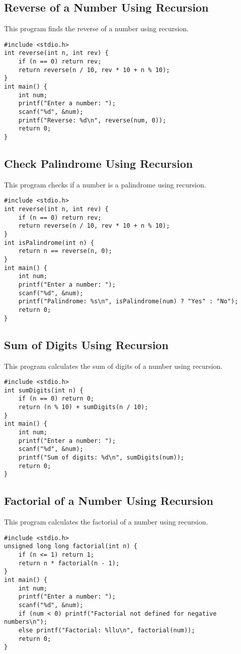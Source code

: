 \documentclass[a4paper,12pt]{article}
\begin{document}
\subsection{Reverse of a Number Using Recursion}
This program finds the reverse of a number using recursion.
\begin{lstlisting}[caption={Reverse of a Number Using Recursion}]
#include <stdio.h>
int reverse(int n, int rev) {
    if (n == 0) return rev;
    return reverse(n / 10, rev * 10 + n % 10);
}
int main() {
    int num;
    printf("Enter a number: ");
    scanf("%d", &num);
    printf("Reverse: %d\n", reverse(num, 0));
    return 0;
}
\end{lstlisting}
\clearpage

\subsection{Check Palindrome Using Recursion}
This program checks if a number is a palindrome using recursion.
\begin{lstlisting}[caption={Check Palindrome Using Recursion}]
#include <stdio.h>
int reverse(int n, int rev) {
    if (n == 0) return rev;
    return reverse(n / 10, rev * 10 + n % 10);
}
int isPalindrome(int n) {
    return n == reverse(n, 0);
}
int main() {
    int num;
    printf("Enter a number: ");
    scanf("%d", &num);
    printf("Palindrome: %s\n", isPalindrome(num) ? "Yes" : "No");
    return 0;
}
\end{lstlisting}
\clearpage

\subsection{Sum of Digits Using Recursion}
This program calculates the sum of digits of a number using recursion.
\begin{lstlisting}[caption={Sum of Digits Using Recursion}]
#include <stdio.h>
int sumDigits(int n) {
    if (n == 0) return 0;
    return (n % 10) + sumDigits(n / 10);
}
int main() {
    int num;
    printf("Enter a number: ");
    scanf("%d", &num);
    printf("Sum of digits: %d\n", sumDigits(num));
    return 0;
}
\end{lstlisting}
\clearpage

\subsection{Factorial of a Number Using Recursion}
This program calculates the factorial of a number using recursion.
\begin{lstlisting}[caption={Factorial of a Number Using Recursion}]
#include <stdio.h>
unsigned long long factorial(int n) {
    if (n <= 1) return 1;
    return n * factorial(n - 1);
}
int main() {
    int num;
    printf("Enter a number: ");
    scanf("%d", &num);
    if (num < 0) printf("Factorial not defined for negative numbers\n");
    else printf("Factorial: %llu\n", factorial(num));
    return 0;
}
\end{lstlisting}
\clearpage
\end{document}
